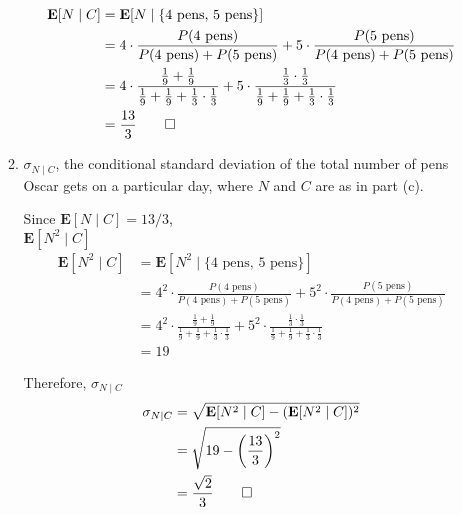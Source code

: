 \documentclass[paper=usletter, fontsize=12pt]{article}
\begin{document}
\begin{enumerate}
\begin{enumerate}
\begin{cproof}
                \begin{align*}
                    \textbf{E}[N \mid C] & = \textbf{E}[N \mid \{\text{4 pens,
                    5 pens}\}] \\
                    & = 4\cdot\frac{P(\text{4 pens})}{P(\text{4 pens}) + P(\text{5 pens})} + 5\cdot\frac{P(\text{5 pens})}{P(\text{4 pens}) + P(\text{5 pens})} \\
                    & = 4\cdot\frac{\frac{1}{9}+\frac{1}{9}}{\frac{1}{9}+\frac{1}{9} + \frac{1}{3}\cdot\frac{1}{3}} + 5\cdot\frac{\frac{1}{3}\cdot\frac{1}{3}}{\frac{1}{9}+\frac{1}{9} + \frac{1}{3}\cdot\frac{1}{3}} \\
                    & = \frac{13}{3}  \qedhere
                \end{align*}
                \endgroup

            \end{cproof}

            \item $\sigma_{N \mid C}$, the conditional standard deviation of
            the total number of pens Oscar gets on a particular day, where $N$
            and $C$ are as in part (c).
            \begin{cproof}

                Since $\textbf{E}[N \mid C]= 13/3$,\\
                $\textbf{E}[N^2 \mid C]$
                \begin{align*}
                    \textbf{E}[N^2 \mid C] & = \textbf{E}[N^2 \mid \{\text{4 pens, 5 pens}\}] \\
                    & = 4^2\cdot\frac{P(\text{4 pens})}{P(\text{4 pens}) + P(\text{5 pens})} + 5^2\cdot\frac{P(\text{5 pens})}{P(\text{4 pens}) + P(\text{5 pens})} \\
                    & = 4^2\cdot\frac{\frac{1}{9}+\frac{1}{9}}{\frac{1}{9}+\frac{1}{9} + \frac{1}{3}\cdot\frac{1}{3}} + 5^2\cdot\frac{\frac{1}{3}\cdot\frac{1}{3}}{\frac{1}{9}+\frac{1}{9} + \frac{1}{3}\cdot\frac{1}{3}} \\
                    & = 19
                \end{align*}
                \endgroup

                Therefore, $\sigma_{N \mid C}$
                \begin{align*}
                    \sigma_{N \mid C} &= \sqrt{\textbf{E}[N^2 \mid C]-(\textbf{E}[N^2 \mid C])^2} \\
                    & = \sqrt{19-\bigg(\frac{13}{3}\bigg)^2}\\
                    & = \frac{\sqrt{2}}{3} \qedhere
                \end{align*}
                \endgroup


\end{cproof}
\end{enumerate}
\end{enumerate}
\end{document}
